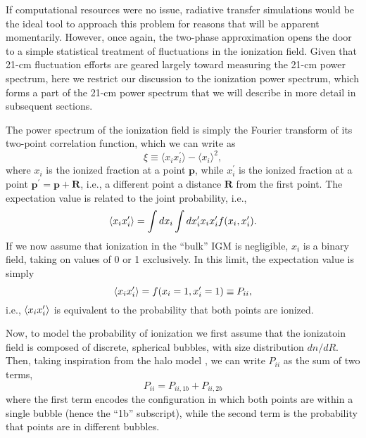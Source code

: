 If computational resources were no issue, radiative transfer simulations would be the ideal tool to approach this problem for reasons that will be apparent momentarily. However, once again, the two-phase approximation opens the door to a simple statistical treatment of fluctuations in the ionization field. Given that 21-cm fluctuation efforts are geared largely toward measuring the 21-cm power spectrum, here we restrict our discussion to the ionization power spectrum, which forms a part of the 21-cm power spectrum that we will describe in more detail in subsequent sections.

The power spectrum of the ionization field is simply the Fourier transform of its two-point correlation function, which we can write as
\begin{equation}
	\xi \equiv \langle x_i x_i^{\prime} \rangle - \langle x_i \rangle^2 ,
\end{equation}
where $x_i$ is the ionized fraction at a point $\mathbf{p}$, while $x_i^{\prime}$ is the ionized fraction at a point $\mathbf{p}^{\prime} = \mathbf{p} + \mathbf{R}$, i.e., a different point a distance $\mathbf{R}$ from the first point. The expectation value is related to the joint probability, i.e.,
\begin{equation}
	\langle x_i x_i^{\prime} \rangle = \int dx_i \int dx_i^{\prime} x_i x_i^{\prime} f(x_i, x_i^{\prime}) .
\end{equation}
If we now assume that ionization in the ``bulk'' IGM is negligible, $x_i$ is a binary field, taking on values of 0 or 1 exclusively. In this limit, the expectation value is simply
\begin{equation}
	\langle x_i x_i^{\prime} \rangle = f(x_i=1, x_i^{\prime}=1) \equiv P_{ii} ,
\end{equation}
i.e., $\langle x_i x_i^{\prime} \rangle$ is equivalent to the probability that both points are ionized. 

Now, to model the probability of ionization we first assume that the ionizatoin field is composed of discrete, spherical bubbles, with size distribution $dn/dR$. Then, taking inspiration from the halo model \cite{Cooray2002}, we can write $P_{ii}$ as the sum of two terms,
\begin{equation}
	P_{ii} = P_{ii,1b} + P_{ii,2b}
\end{equation}
where the first term encodes the configuration in which both points are within a single bubble (hence the ``1b'' subscript), while the second term is the probability that points are in different bubbles. 







